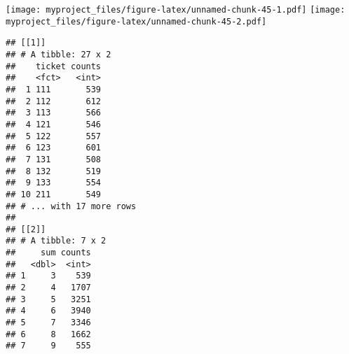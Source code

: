 \documentclass[
]{article}
\begin{document}
\texttt{[image: myproject\_files/figure-latex/unnamed-chunk-45-1.pdf]}
\texttt{[image: myproject\_files/figure-latex/unnamed-chunk-45-2.pdf]}

\begin{verbatim}
## [[1]]
## # A tibble: 27 x 2
##    ticket counts
##    <fct>   <int>
##  1 111       539
##  2 112       612
##  3 113       566
##  4 121       546
##  5 122       557
##  6 123       601
##  7 131       508
##  8 132       519
##  9 133       554
## 10 211       549
## # ... with 17 more rows
## 
## [[2]]
## # A tibble: 7 x 2
##     sum counts
##   <dbl>  <int>
## 1     3    539
## 2     4   1707
## 3     5   3251
## 4     6   3940
## 5     7   3346
## 6     8   1662
## 7     9    555
\end{verbatim}
\end{document}

